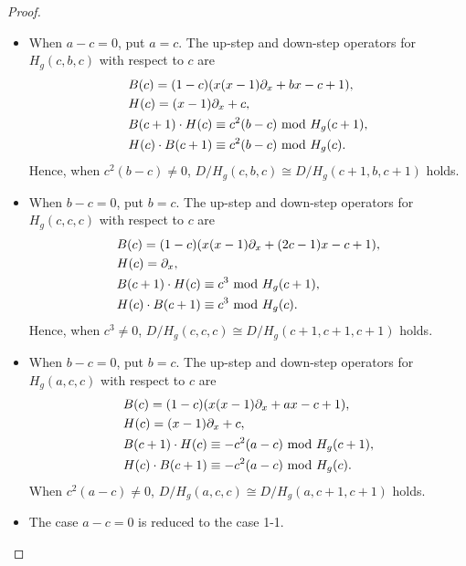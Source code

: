 \documentclass{article}
\def\p{\partial}
\def\aalpha{a}
\def\bbeta{b}
\def\ggamma{c}
\def\Hg{H_g}
\begin{document}
\begin{proof}
\begin{itemize}
\item[(1)] When $\aalpha - \ggamma = 0$,
put $\aalpha = \ggamma$.
The up-step and down-step operators
for $\Hg(\ggamma, \bbeta, \ggamma)$ with respect to $\ggamma$ 
are
\begin{align*}
&B(\ggamma) = (1-\ggamma)(x(x-1) \p_x +\bbeta x - \ggamma + 1), \\
&H(\ggamma) = (x-1) \p_x + \ggamma, \\
&B(\ggamma+1) \cdot H(\ggamma) \equiv \ggamma^2 (\bbeta - \ggamma) ~{\rm mod}~ \Hg(\ggamma+1), \\
&H(\ggamma) \cdot B(\ggamma+1) \equiv \ggamma^2 (\bbeta - \ggamma) ~{\rm mod}~ \Hg(\ggamma).
\end{align*}
Hence, when $\ggamma^2 (\bbeta - \ggamma) \neq 0$,
$D/\Hg(\ggamma, \bbeta, \ggamma) \cong D/\Hg(\ggamma+1, \bbeta, \ggamma+1)$
holds. 

\item[(1-1)] When $\bbeta - \ggamma = 0$,
put $\bbeta = \ggamma$.
The up-step and down-step operators for  $\Hg(\ggamma, \ggamma, \ggamma)$
with respect to $\ggamma$ are
\begin{align*}
&B(\ggamma) = (1-\ggamma)(x(x-1) \p_x + (2\ggamma-1)x - \ggamma+1), \\
&H(\ggamma) = \p_x, \\
&B(\ggamma+1) \cdot H(\ggamma) \equiv \ggamma^3 ~{\rm mod}~ \Hg(\ggamma+1), \\
&H(\ggamma) \cdot B(\ggamma+1) \equiv \ggamma^3  ~{\rm mod}~ \Hg(\ggamma).
\end{align*}
Hence, when $\ggamma^3 \neq 0$,
$D/\Hg(\ggamma, \ggamma, \ggamma) \cong D/\Hg(\ggamma+1, \ggamma+1, \ggamma+1)$
holds.

\item[(2)] When $\bbeta - \ggamma = 0$,
put $\bbeta = \ggamma$.
The up-step and down-step operators for $\Hg(\aalpha, \ggamma, \ggamma)$
with respect to $\ggamma$ are
\begin{align*}
&B(\ggamma) = (1-\ggamma)(x(x-1) \p_x +\aalpha x - \ggamma + 1), \\
&H(\ggamma) = (x-1) \p_x + \ggamma, \\ 
&B(\ggamma+1) \cdot H(\ggamma) \equiv -\ggamma^2 (\aalpha - \ggamma) ~{\rm mod}~ \Hg(\ggamma+1), \\
&H(\ggamma) \cdot B(\ggamma+1) \equiv -\ggamma^2 (\aalpha - \ggamma) ~{\rm mod}~ \Hg(\ggamma).
\end{align*}
When $\ggamma^2 (\aalpha - \ggamma) \neq 0$,
$D/\Hg(\aalpha, \ggamma, \ggamma) \cong D/\Hg(\aalpha, \ggamma+1, \ggamma+1)$
holds. 

\item[(2-1)] The case $\aalpha - \ggamma = 0$ 
is reduced to the case 1-1.
\end{itemize}
\end{proof}
\end{document}
